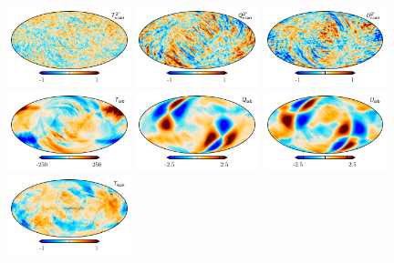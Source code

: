 \documentclass[twocolumn]{../../common/aa}
\begin{document}
\begin{figure}[t]
	\centering
	\includegraphics[width=0.32\textwidth]{figures/K_ncorr_I.pdf}
	\includegraphics[width=0.32\textwidth]{figures/K_ncorr_Q.pdf}
	\includegraphics[width=0.32\textwidth]{figures/K_ncorr_U.pdf}\\
	\includegraphics[width=0.32\textwidth]{figures/K_orb_I.pdf}
	\includegraphics[width=0.32\textwidth]{figures/K_orb_Q.pdf}
	\includegraphics[width=0.32\textwidth]{figures/K_orb_U.pdf}\\
	\includegraphics[width=0.32\textwidth]{figures/K_leak_I.pdf}

\end{figure}
\end{document}
